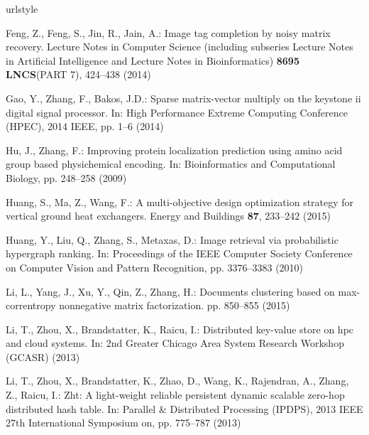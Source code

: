 \documentclass[runningheads,a4paper]{llncs}
\begin{document}
\begin{thebibliography}{10}
\providecommand{\url}[1]{{#1}}
\providecommand{\urlprefix}{URL }
\expandafter\ifx\csname urlstyle\endcsname\relax
  \providecommand{\doi}[1]{DOI~\discretionary{}{}{}#1}\else
  \providecommand{\doi}{DOI~\discretionary{}{}{}\begingroup
  \urlstyle{rm}\Url}\fi

Feng, Z., Feng, S., Jin, R., Jain, A.: Image tag completion by noisy matrix
  recovery.
\newblock Lecture Notes in Computer Science (including subseries Lecture Notes
  in Artificial Intelligence and Lecture Notes in Bioinformatics) \textbf{8695
  LNCS}(PART 7), 424--438 (2014)

Gao, Y., Zhang, F., Bakos, J.D.: Sparse matrix-vector multiply on the keystone
  ii digital signal processor.
\newblock In: High Performance Extreme Computing Conference (HPEC), 2014 IEEE,
  pp. 1--6 (2014)

Hu, J., Zhang, F.: Improving protein localization prediction using amino acid
  group based physichemical encoding.
\newblock In: Bioinformatics and Computational Biology, pp. 248--258 (2009)

Huang, S., Ma, Z., Wang, F.: A multi-objective design optimization strategy for
  vertical ground heat exchangers.
\newblock Energy and Buildings \textbf{87}, 233--242 (2015)

Huang, Y., Liu, Q., Zhang, S., Metaxas, D.: Image retrieval via probabilistic
  hypergraph ranking.
\newblock In: Proceedings of the IEEE Computer Society Conference on Computer
  Vision and Pattern Recognition, pp. 3376--3383 (2010)

Li, L., Yang, J., Xu, Y., Qin, Z., Zhang, H.: Documents clustering based on
  max-correntropy nonnegative matrix factorization.
\newblock pp. 850--855 (2015)

Li, T., Zhou, X., Brandstatter, K., Raicu, I.: Distributed key-value store on
  hpc and cloud systems.
\newblock In: 2nd Greater Chicago Area System Research Workshop (GCASR) (2013)

Li, T., Zhou, X., Brandstatter, K., Zhao, D., Wang, K., Rajendran, A., Zhang,
  Z., Raicu, I.: Zht: A light-weight reliable persistent dynamic scalable
  zero-hop distributed hash table.
\newblock In: Parallel \& Distributed Processing (IPDPS), 2013 IEEE 27th
  International Symposium on, pp. 775--787 (2013)


\end{thebibliography}
\end{document}
